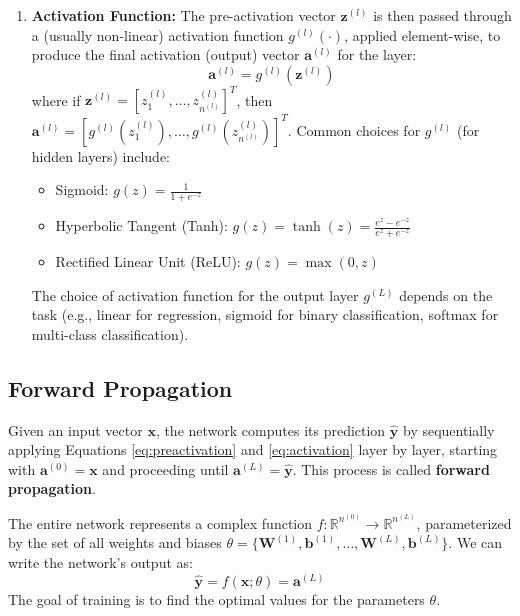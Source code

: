 \documentclass[11pt,twoside,openright]{report}
\begin{document}
\begin{enumerate}
    \item \textbf{Activation Function:} The pre-activation vector $\mathbf{z}^{(l)}$ is then passed through a (usually non-linear) activation function $g^{(l)}(\cdot)$, applied element-wise, to produce the final activation (output) vector $\mathbf{a}^{(l)}$ for the layer:
        \begin{equation} \label{eq:activation}
            \mathbf{a}^{(l)} = g^{(l)}(\mathbf{z}^{(l)})
        \end{equation}
        where if $\mathbf{z}^{(l)} = [z_1^{(l)}, \dots, z_{n^{(l)}}^{(l)}]^T$, then $\mathbf{a}^{(l)} = [g^{(l)}(z_1^{(l)}), \dots, g^{(l)}(z_{n^{(l)}}^{(l)})]^T$. Common choices for $g^{(l)}$ (for hidden layers) include:
        \begin{itemize}
            \item Sigmoid: $g(z) = \frac{1}{1 + e^{-z}}$
            \item Hyperbolic Tangent (Tanh): $g(z) = \tanh(z) = \frac{e^z - e^{-z}}{e^z + e^{-z}}$
            \item Rectified Linear Unit (ReLU): $g(z) = \max(0, z)$
        \end{itemize}
        The choice of activation function for the output layer $g^{(L)}$ depends on the task (e.g., linear for regression, sigmoid for binary classification, softmax for multi-class classification).
\end{enumerate}

\subsection{Forward Propagation}
Given an input vector $\mathbf{x}$, the network computes its prediction $\hat{\mathbf{y}}$ by sequentially applying Equations \ref{eq:preactivation} and \ref{eq:activation} layer by layer, starting with $\mathbf{a}^{(0)} = \mathbf{x}$ and proceeding until $\mathbf{a}^{(L)} = \hat{\mathbf{y}}$. This process is called \textbf{forward propagation}.

The entire network represents a complex function $f: \mathbb{R}^{n^{(0)}} \to \mathbb{R}^{n^{(L)}}$, parameterized by the set of all weights and biases $\theta = \{ \mathbf{W}^{(1)}, \mathbf{b}^{(1)}, \dots, \mathbf{W}^{(L)}, \mathbf{b}^{(L)} \}$. We can write the network's output as:
$$ \hat{\mathbf{y}} = f(\mathbf{x}; \theta) = \mathbf{a}^{(L)} $$
The goal of training is to find the optimal values for the parameters $\theta$.

\end{document}
